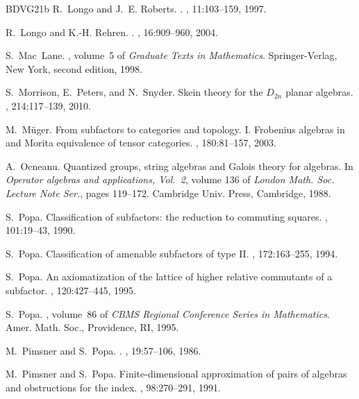 \documentclass[11pt,a4paper]{article}
\theoremstyle{plain}
\theoremstyle{definition}
\theoremstyle{remark}
\numberwithin{equation}{section}%
\begin{document}
\begin{thebibliography}{BDVG21b}
R.~Longo and J.~E. Roberts.
.
, 11:103--159, 1997.

R.~Longo and K.-H. Rehren.
.
, 16:909--960, 2004.

S.~Mac~Lane.
, volume~5 of 
{\em Graduate Texts in Mathematics}.
\newblock Springer-Verlag, New York, second edition, 1998.

S.~Morrison, E.~Peters, and N.~Snyder.
\newblock Skein theory for the {$D_{2n}$} planar algebras.
, 214:117--139, 2010.

M.~M{\"u}ger.
\newblock From subfactors to categories and topology. {I}. {F}robenius algebras
  in and {M}orita equivalence of tensor categories.
, 180:81--157, 2003.

A.~Ocneanu.
\newblock Quantized groups, string algebras and {G}alois theory for algebras.
\newblock In {\em Operator algebras and applications, {V}ol.\ 2}, volume 136 of
  {\em London Math. Soc. Lecture Note Ser.}, pages 119--172. Cambridge Univ.
  Press, Cambridge, 1988.

S.~Popa.
\newblock Classification of subfactors: the reduction to commuting squares.
, 101:19--43, 1990.

S.~Popa.
\newblock Classification of amenable subfactors of type {II}.
, 172:163--255, 1994.

S.~Popa.
\newblock An axiomatization of the lattice of higher relative commutants of a
  subfactor.
, 120:427--445, 1995.

S.~Popa.
, volume~86
  of {\em CBMS Regional Conference Series in Mathematics}.
\newblock Amer. Math. Soc., Providence, RI, 1995.

M.~Pimsner and S.~Popa.
.
, 19:57--106, 1986.

M.~Pimsner and S.~Popa.
\newblock Finite-dimensional approximation of pairs of algebras and
  obstructions for the index.
, 98:270--291, 1991.


\end{thebibliography}
\end{document}
